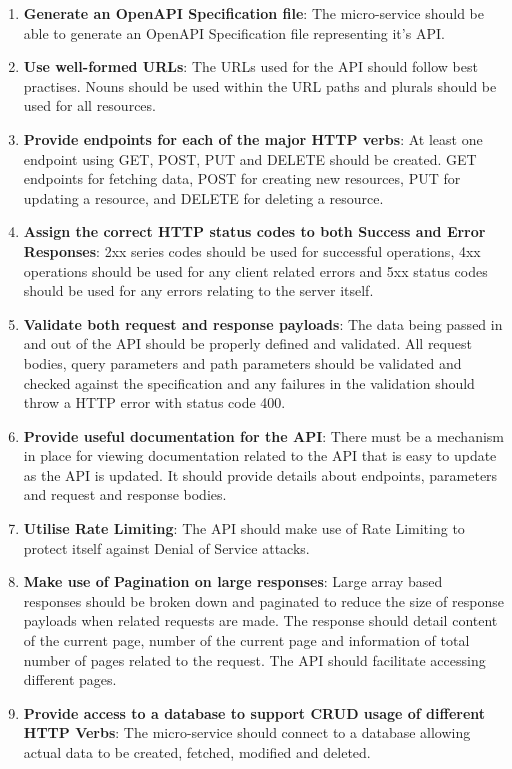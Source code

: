 \begin{enumerate}
    \item \textbf{Generate an OpenAPI Specification file}: The micro-service should be able to generate an OpenAPI Specification file representing it's API.
    \item \textbf{Use well-formed URLs}: The URLs used for the API should follow best practises. Nouns should be used within the URL paths and plurals should be used for all resources. 
    \item \textbf{Provide endpoints for each of the major HTTP verbs}: At least one endpoint using GET, POST, PUT and DELETE should be created. GET endpoints for fetching data, POST for creating new resources, PUT for updating a resource, and DELETE for deleting a resource. 
    \item \textbf{Assign the correct HTTP status codes to both Success and Error Responses}: 2xx series codes should be used for successful operations, 4xx operations should be used for any client related errors and 5xx status codes should be used for any errors relating to the server itself.
    \item \textbf{Validate both request and response payloads}: The data being passed in and out of the API should be properly defined and validated. All request bodies, query parameters and path parameters should be validated and checked against the specification and any failures in the validation should throw a HTTP error with status code 400.
    \item \textbf{Provide useful documentation for the API}: There must be a mechanism in place for viewing documentation related to the API that is easy to update as the API is updated. It should provide details about endpoints, parameters and request and response bodies. 
    \item \textbf{Utilise Rate Limiting}: The API should make use of Rate Limiting to protect itself against Denial of Service attacks.
    \item \textbf{Make use of Pagination on large responses}: Large array based responses should be broken down and paginated to reduce the size of response payloads when related requests are made. The response should detail content of the current page, number of the current page and information of total number of pages related to the request. The API should facilitate accessing different pages.
    \item \textbf{Provide access to a database to support CRUD usage of different HTTP Verbs}:  The micro-service should connect to a database allowing actual data to be created, fetched, modified and deleted.
\end{enumerate}

